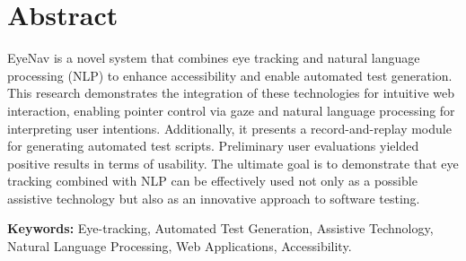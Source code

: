 \section{Abstract}

EyeNav is a novel system that combines eye tracking and natural language processing (NLP) to enhance accessibility and enable automated test generation. This research demonstrates the integration of these technologies for intuitive web interaction, enabling pointer control via gaze and natural language processing for interpreting user intentions. Additionally, it presents a record-and-replay module for generating automated test scripts. Preliminary user evaluations yielded positive results in terms of usability. The ultimate goal is to demonstrate that eye tracking combined with NLP can be effectively used not only as a possible assistive technology but also as an innovative approach to software testing.

\textbf{Keywords:}  Eye-tracking, Automated Test Generation, Assistive Technology, Natural Language Processing, Web Applications, Accessibility.
